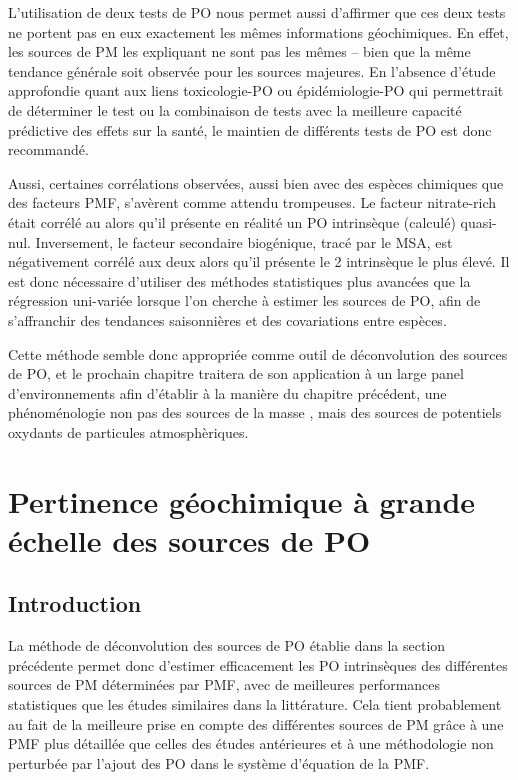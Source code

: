 L'utilisation de deux tests de PO nous permet aussi d'affirmer que ces deux tests ne portent
pas en eux exactement les mêmes informations géochimiques. En effet, les sources de PM les
expliquant ne sont pas les mêmes -- bien que la même tendance générale soit observée pour les sources
majeures. En l'absence d'étude approfondie quant aux liens toxicologie-PO ou
épidémiologie-PO qui permettrait de déterminer le test ou la combinaison de tests avec la
meilleure capacité prédictive des effets sur la santé, le maintien de
différents tests de PO est donc recommandé.

Aussi, certaines corrélations observées, aussi bien avec des espèces chimiques que des
facteurs PMF, s'avèrent comme attendu trompeuses. Le facteur nitrate-rich était corrélé au
\POAAv{} alors qu'il présente en réalité un PO intrinsèque (calculé) quasi-nul. Inversement, le facteur
secondaire biogénique, tracé par le MSA, est négativement corrélé aux deux \OPv{} alors
qu'il présente le 2\ieme{} \PODTT{} intrinsèque le plus élevé. Il est donc nécessaire
d'utiliser des méthodes statistiques plus avancées que la régression uni-variée lorsque
l'on cherche à estimer les sources de PO, afin de s'affranchir des tendances saisonnières et
des covariations entre espèces.

Cette méthode semble donc appropriée comme outil de déconvolution des sources de PO, et le
prochain chapitre traitera de son application à un large panel d'environnements afin
d'établir à la manière du chapitre précédent, une phénoménologie non pas des sources de la
masse \PMdix, mais des sources de potentiels oxydants de particules atmosphèriques.


\section{Pertinence géochimique à grande échelle des sources de PO}%
\label{sec:synthèse_grande_échelle}

\subsection{Introduction}%
\label{sub:introduction_synthèse_nationale}

La méthode de déconvolution des sources de PO établie dans la section précédente permet
donc d'estimer efficacement les PO intrinsèques des différentes sources de PM déterminées
par PMF, avec de meilleures performances statistiques que les études similaires dans la
littérature.  Cela tient probablement au fait de la meilleure prise en compte des
différentes sources de PM grâce à une PMF plus détaillée que celles des études antérieures
et à une méthodologie non perturbée par l'ajout des PO dans le système d'équation de la PMF.

